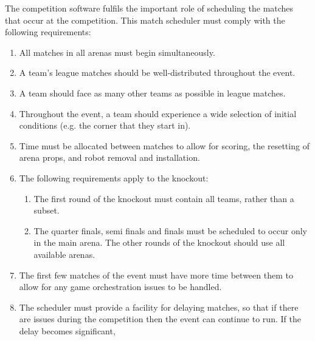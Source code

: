 The competition software fulfils the important role of scheduling the matches that occur at the competition.  This match scheduler must comply with the following requirements:
\begin{enumerate}
\item All matches in all arenas must begin simultaneously.
\item A team's league matches should be well-distributed throughout the event.
\item A team should face as many other teams as possible in league matches.
\item Throughout the event, a team should experience a wide selection of initial conditions (e.g. the corner that they start in).
\item Time must be allocated between matches to allow for scoring, the resetting of arena props, and robot removal and installation.
\item The following requirements apply to the knockout:
  \begin{enumerate}
  \item The first round of the knockout must contain all teams, rather than a subset.
  \item The quarter finals, semi finals and finals must be scheduled to occur only in the main arena.  The other rounds of the knockout should use all available arenas.
  \end{enumerate}

\item The first few matches of the event must have more time between them to allow for any game orchestration issues to be handled.
\item The scheduler must provide a facility for delaying matches, so that if there are issues during the competition then the event can continue to run.  If the delay becomes significant, 
\end{enumerate}
